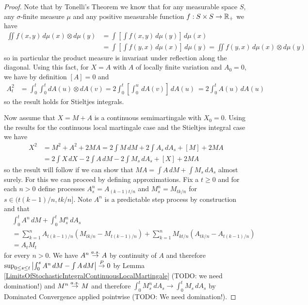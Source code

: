 \begin{proof}
Note that by Tonelli's Theorem we know that for any measurable space $S$, any $\sigma$-finite measure $\mu$ and any positive measurable function $f : S \times S \to \mathbb{R}_+$ we have
\begin{align*}
\iint f(x,y) \, d\mu(x) \otimes d\mu(y) &= \int \left [ \int f(x,y) \, d\mu(y) \right] \, d\mu(x) \\
&= \int \left [ \int f(y,x) \, d\mu(x) \right] \, d\mu(y)  = \iint f(y,x) \, d\mu(x) \otimes d\mu(y)
\end{align*}
so in particular the product measure is invariant under reflection along the diagonal. Using this fact, for $X = A$ with $A$ of locally finite variation and $A_0 = 0$, we have by definition $[A] = 0$ and 
\begin{align*}
A_t^2 &= \int_0^t \int_0^t dA(u) \otimes dA(v) =2\int_0^t \left[\int_0^u \, dA(v)\right] \, dA(u) \ = 2 \int_0^t A(u) \, dA(u)
\end{align*}
so the result holds for Stieltjes integrals.

Now assume that $X = M+A$ is a continuous semimartingale with $X_0 = 0$.  Using the results for the continuous local martingale case and the Stieltjes integral case we have
\begin{align*}
X^2 &= M^2 + A^2 + 2MA = 2 \int M \, dM + 2 \int A_s \, dA_s + [M] + 2MA\\
&=2 \int X \, dX - 2 \int A \, dM - 2 \int M_s \, dA_s + [X] + 2MA 
\end{align*}
so the result will follow if we can show that $MA = \int A \, dM + \int M_s \, dA_s$ almost surely.  For this we can proceed by defining approximations.  Fix a $t \geq 0$ and for each $n > 0$ define processes $A^n_s = A_{(k-1)t/n}$ and $M^n_s = M_{tk/n}$ for $s \in (t(k-1)/n, tk/n]$.  Note $A^n$ is a predictable step process by construction and that
\begin{align*}
&\int_0^t A^n \, dM + \int_0^t M^n_s \, dA_s \\
&= \sum_{k=1}^n A_{t(k-1)/n} \left(M_{tk/n} - M_{t(k-1)/n}\right) + \sum_{k=1}^n M_{kt/n} \left(A_{tk/n} - A_{t(k-1)/n}\right) \\
&=A_t M_t
\end{align*}
for every $n > 0$.  We have $A^n \overset{a.s.}\to A$ by continuity of $A$ and therefore $\sup_{0 \leq s \leq t} \left \vert \int_0^s A^n \, dM - \int A \, dM \right \vert \overset{P}\to 0$ by Lemma \ref{LimitsOfStochasticIntegralContinuousLocalMartingale} (TODO: we need domination!) and $M^n \overset{a.s.}\to M$ and therefore $\int_0^t M^n_s \, dA_s \to \int_0^t M_s \, dA_s$ by Dominated Convergence applied pointwise (TODO: We need domination!).


\end{proof}

